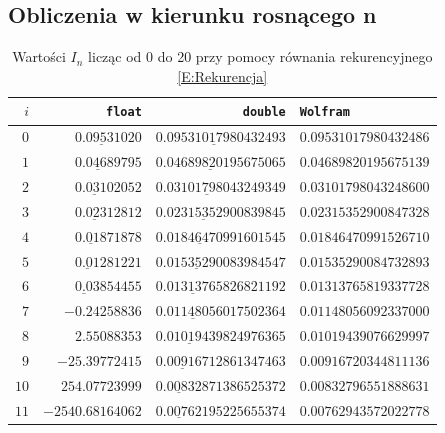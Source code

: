 \documentclass[11pt,leqno]{article}
\begin{document}
\subsection{Obliczenia w kierunku rosnącego n}\label{SS:Rosnaco}
\begin{table}[!h]
\renewcommand{\arraystretch}{1.1}
\vspace{-2em}
\caption{Wartości $I_{n}$ licząc od 0 do 20 przy pomocy równania rekurencyjnego \eqref{E:Rekurencja}}\label{T:RekurencjaDoPrzodu}
\vspace{-1em}
\begin{center}
    \begin{tabular}{r|r|r|l}
        \texttt{$i$}  &       \texttt{float}      &           \texttt{double}         &    \texttt{Wolfram}   \\ \hline
        $0$           &  $\underline{0.095310}20$ & $\underline{0.095310179804324}93$ & $0.09531017980432486$ \\
        $1$           &  $\underline{0.04689}795$ & $\underline{0.04689820195675}065$ & $0.04689820195675139$ \\
        $2$           &  $\underline{0.0310}2052$ & $\underline{0.0310179804324}9349$ & $0.03101798043248600$ \\
        $3$           &  $\underline{0.0231}2812$ & $\underline{0.023153529008}39845$ & $0.02315352900847328$ \\
        $4$           &  $\underline{0.018}71878$ & $\underline{0.01846470991}601545$ & $0.01846470991526710$ \\
        $5$           &  $\underline{0.01}281221$ & $\underline{0.0153529008}3984547$ & $0.01535290084732893$ \\
        $6$           &  $\underline{0.0}3854455$ & $\underline{0.013137658}26821192$ & $0.01313765819337728$ \\
        $7$           &            $-0.24258836$  & $\underline{0.011480560}17502364$ & $0.01148056092337000$ \\
        $8$           &             $2.55088353$  & $\underline{0.01019439}824976365$ & $0.01019439076629997$ \\
        $9$           &           $-25.39772415$  & $\underline{0.009167}12861347463$ & $0.00916720344811136$ \\
        $10$          &           $254.07723999$  & $\underline{0.00832}871386525372$ & $0.00832796551888631$ \\
        $11$          &         $-2540.68164062$  & $\underline{0.00762}195225655374$ & $0.00762943572022778$ \\

\end{tabular}
\end{center}
\end{table}
\end{document}

